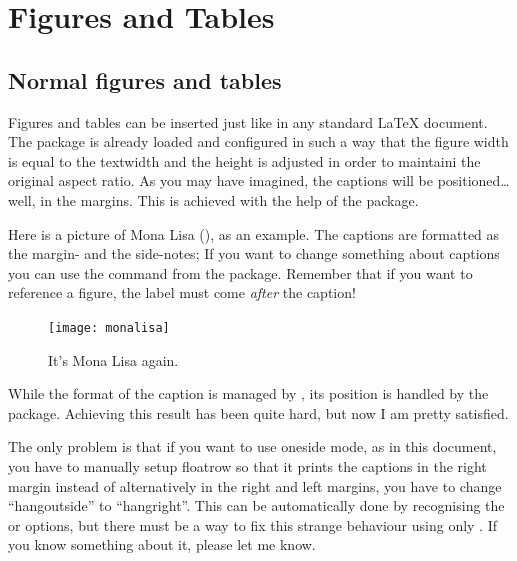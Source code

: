 \setchapterpreamble[u]{\margintoc}
\chapter{Figures and Tables\footnotemark[0]}


\section{Normal figures and tables}

Figures and tables can be inserted just like in any standard 
\LaTeX\xspace document. The  package is already loaded 
and configured in such a way that the figure width is equal to the 
textwidth and the height is adjusted in order to maintaini the original 
aspect ratio. As you may have imagined, the captions will be 
positioned\ldots well, in the margins. This is achieved with the help of 
the  package.

Here is a picture of Mona Lisa (), as an example. 
The captions are formatted as the margin- and the side-notes; If you 
want to change something about captions you can use the command 
 from the  package. Remember that if 
you want to reference a figure, the label must come \emph{after} the 
caption!

\begin{figure}[hb]
	\texttt{[image: monalisa]}
	\caption[Mona Lisa, again]{It's Mona Lisa again. \blindtext}
\end{figure}

While the format of the caption is managed by , its 
position is handled by the  package. Achieving this 
result has been quite hard, but now I am pretty satisfied.

\begin{kaobox}[frametitle=To Do]
The only problem is that if you want to use oneside mode, as in this 
document, you have to manually setup floatrow so that it prints the 
captions in the right margin instead of alternatively in the right and 
left margins, \ie you have to change \enquote{hangoutside} to 
\enquote{hangright}. This can be automatically done by recognising the 
 or  options, but there must be a way to 
fix this strange behaviour using only . If you know 
something about it, please let me know.
\end{kaobox}

